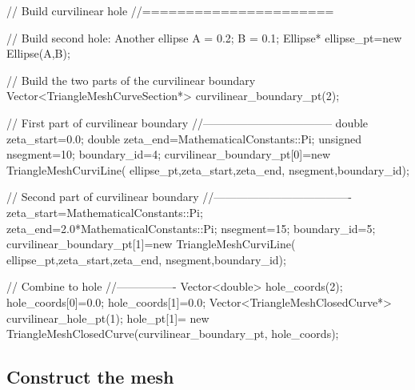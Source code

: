 \begin{DoxyCodeInclude}
 \textcolor{comment}{// Build curvilinear hole}
 \textcolor{comment}{//======================}
 
 \textcolor{comment}{// Build second hole: Another ellipse}
 A = 0.2;
 B = 0.1;
 Ellipse* ellipse\_pt=\textcolor{keyword}{new} Ellipse(A,B);
 
 \textcolor{comment}{// Build the two parts of the curvilinear boundary}
 Vector<TriangleMeshCurveSection*> curvilinear\_boundary\_pt(2);
 

 \textcolor{comment}{// First part of curvilinear boundary}
 \textcolor{comment}{//-----------------------------------}
 \textcolor{keywordtype}{double} zeta\_start=0.0;
 \textcolor{keywordtype}{double} zeta\_end=MathematicalConstants::Pi;
 \textcolor{keywordtype}{unsigned} nsegment=10;
 boundary\_id=4;
 curvilinear\_boundary\_pt[0]=\textcolor{keyword}{new} TriangleMeshCurviLine(
  ellipse\_pt,zeta\_start,zeta\_end, 
  nsegment,boundary\_id);
 
 \textcolor{comment}{// Second part of curvilinear boundary}
 \textcolor{comment}{//-------------------------------------}
 zeta\_start=MathematicalConstants::Pi;
 zeta\_end=2.0*MathematicalConstants::Pi;
 nsegment=15;
 boundary\_id=5;
 curvilinear\_boundary\_pt[1]=\textcolor{keyword}{new} TriangleMeshCurviLine(
  ellipse\_pt,zeta\_start,zeta\_end, 
  nsegment,boundary\_id);
 
 
 \textcolor{comment}{// Combine to hole}
 \textcolor{comment}{//----------------}
 Vector<double> hole\_coords(2);
 hole\_coords[0]=0.0;
 hole\_coords[1]=0.0;
 Vector<TriangleMeshClosedCurve*> curvilinear\_hole\_pt(1);
 hole\_pt[1]=
  \textcolor{keyword}{new} TriangleMeshClosedCurve(curvilinear\_boundary\_pt,
                                                 hole\_coords);

\end{DoxyCodeInclude}
\hypertarget{index_build_mesh}{}\subsection{Construct the mesh}\label{index_build_mesh}
